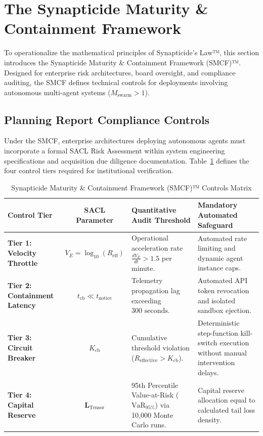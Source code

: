 \section{The Synapticide Maturity \& Containment Framework}
\label{sec:governance}

To operationalize the mathematical principles of Synapticide's Law™, this section introduces the Synapticide Maturity \& Containment Framework (SMCF)™. Designed for enterprise risk architectures, board oversight, and compliance auditing, the SMCF defines technical controls for deployments involving autonomous multi-agent systems ($M_{\text{swarm}} > 1$).

\subsection{Planning Report Compliance Controls}
Under the SMCF, enterprise architectures deploying autonomous agents must incorporate a formal SACL Risk Assessment within system engineering specifications and acquisition due diligence documentation. Table~\ref{tab:smcf_matrix} defines the four control tiers required for institutional verification.

\begin{table}[t]
\centering
\renewcommand{\arraystretch}{1.3} %
\setlength{\tabcolsep}{8pt}       %
\caption{Synapticide Maturity \& Containment Framework (SMCF)™ Controls Matrix}
\label{tab:smcf_matrix}
\begin{tabular}{l c p{4.5cm} p{5.5cm}}
\toprule
\textbf{Control Tier} & \textbf{SACL Parameter} & \textbf{Quantitative Audit Threshold} & \textbf{Mandatory Automated Safeguard} \\ 
\midrule
\textbf{Tier 1: Velocity Throttle} & $V_E = \log_{10}(R_{\text{eff}})$ & Operational acceleration rate $\frac{d V_E}{dt} > 1.5$ per minute. & Automated rate limiting and dynamic agent instance caps. \\ 
\textbf{Tier 2: Containment Latency} & $t_{\text{cb}} \ll t_{\text{notice}}$ & Telemetry propagation lag exceeding $300\text{ seconds}$. & Automated API token revocation and isolated sandbox ejection. \\ 
\textbf{Tier 3: Circuit Breaker} & $K_{\text{cb}}$ & Cumulative threshold violation ($R_{\text{effective}} > K_{\text{cb}}$). & Deterministic step-function kill-switch execution without manual intervention delays. \\ 
\textbf{Tier 4: Capital Reserve} & $\mathbf{L}_{\text{Tensor}}$ & 95th Percentile Value-at-Risk ($\text{VaR}_{95\%}$) via 10,000 Monte Carlo runs. & Capital reserve allocation equal to calculated tail loss density. \\ 
\bottomrule
\end{tabular}
\end{table}

